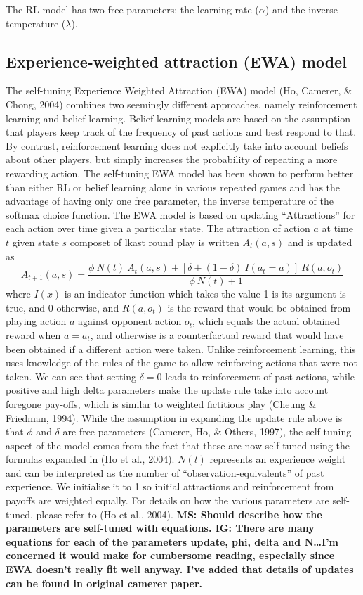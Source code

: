 \documentclass[man,floatsintext]{apa6}
\begin{document}
The RL model has two free parameters: the learning rate (\(\alpha\)) and the inverse temperature (\(\lambda\)).

\hypertarget{experience-weighted-attraction-ewa-model}{%
\subsection{Experience-weighted attraction (EWA) model}\label{experience-weighted-attraction-ewa-model}}

The self-tuning Experience Weighted Attraction (EWA) model (Ho, Camerer, \& Chong, 2004) combines two seemingly different approaches, namely reinforcement learning and belief learning. Belief learning models are based on the assumption that players keep track of the frequency of past actions and best respond to that. By contrast, reinforcement learning does not explicitly take into account beliefs about other players, but simply increases the probability of repeating a more rewarding action. The self-tuning EWA model has been shown to perform better than either RL or belief learning alone in various repeated games and has the advantage of having only one free parameter, the inverse temperature of the softmax choice function. The EWA model is based on updating ``Attractions'' for each action over time given a particular state. The attraction of action \(a\) at time \(t\) given state \(s\) composet of lkast round play is written \(A_{t}(a, s)\) and is updated as
\[ A_{t+1}(a,s) =  \frac{\phi \ N(t) \ A_{t}(a,s) + [ \delta + (1-\delta) \ I(a_t = a )] \ R(a,o_t) } {\phi \ N(t) + 1} \]
where \(I(x)\) is an indicator function which takes the value 1 is its argument is true, and 0 otherwise, and \(R(a,o_t)\) is the reward that would be obtained from playing action \(a\) against opponent action \(o_t\), which equals the actual obtained reward when \(a = a_t\), and otherwise is a counterfactual reward that would have been obtained if a different action were taken. Unlike reinforcement learning, this uses knowledge of the rules of the game to allow reinforcing actions that were not taken. We can see that setting \(\delta = 0\) leads to reinforcement of past actions, while positive and high delta parameters make the update rule take into account foregone pay-offs, which is similar to weighted fictitious play (Cheung \& Friedman, 1994). While the assumption in expanding the update rule above is that \(\phi\) and \(\delta\) are free parameters (Camerer, Ho, \& Others, 1997), the self-tuning aspect of the model comes from the fact that these are now self-tuned using the formulas expanded in (Ho et al., 2004). \(N(t)\) represents an experience weight and can be interpreted as the number of \enquote{observation-equivalents} of past experience. We initialise it to 1 so initial attractions and reinforcement from payoffs are weighted equally. For details on how the various parameters are self-tuned, please refer to (Ho et al., 2004). \textbf{MS: Should describe how the parameters are self-tuned with equations. IG: There are many equations for each of the parameters update, phi, delta and N\ldots{}I'm concerned it would make for cumbersome reading, especially since EWA doesn't really fit well anyway. I've added that details of updates can be found in original camerer paper.}
\end{document}
